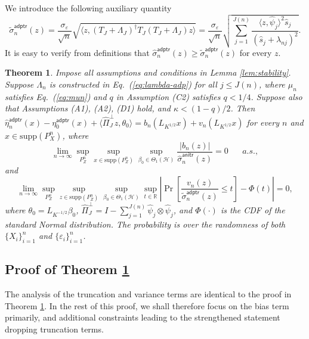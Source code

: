\documentclass[11pt,a4paper]{article}
\renewcommand{\hat}{\widehat}
\renewcommand{\tilde}{\widetilde}
\theoremstyle{definition}
\theoremstyle{plain}
\newtheorem{theorem}{Theorem}[section]
\theoremstyle{remark}
\newcommand{\supp}{\mathrm{supp}}
\newcommand{\mX}{\mathcal X}
\newcommand{\mH}{\mathcal H}
\newcommand{\anitr}{\mathsf{anitr}}
\newcommand{\adptr}{\mathsf{adptr}}
\begin{document}
We introduce the following auxiliary quantity
$$
\tilde\sigma_n^\adptr(z) =  \frac{\sigma_\varepsilon}{\sqrt{n}}\sqrt{\langle z, (T_J+\Lambda_J)^\dagger T_J(T_J+\Lambda_J)z\rangle} = \frac{\sigma_\varepsilon}{\sqrt{n}}\sqrt{\sum_{j=1}^{J(n)}\frac{\langle z,\hat\psi_j\rangle^2\hat s_j}{(\hat s_j+\lambda_{nj})^2}}.
$$
It is easy to verify from definitions that $\hat\sigma_n^\adptr(z)\geq \tilde\sigma_n^\adptr(z)$ for every $z$.

\begin{theorem}
Impose all assumptions and conditions in Lemma \ref{lem:stability}. Suppose $\Lambda_n$ is constructed in Eq.~(\ref{eq:lambda-adp}) for all $j\leq J(n)$,
where $\mu_n$ satisfies Eq.~(\ref{eq:mun}) and $q$ in Assumption (C2) satisfies $q<1/4$. Suppose also that Assumptions (A1), (A2), (D1) hold, and $\kappa<(1-q)/2$. Then 
$\hat\eta_n^\adptr(x)-\eta_0^\adptr(x)+\langle\hat\Pi_J^\perp z,\theta_0\rangle = b_n(L_{K^{1/2}}x)+v_n(L_{K^{1/2}}x)$ for every $n$ and $x\in\supp(P_X^n)$, where
$$
\lim_{n\to\infty}\sup_{P_Z^n}\sup_{x\in\supp(P_Z^n)}\sup_{\beta_0\in\Theta_1(\mH)} \frac{|b_n(z)|}{\hat\sigma_n^\anitr(z)} = 0\;\;\;\;\;\;a.s.,
$$
and
$$
\lim_{n\to\infty} \sup_{P_Z^n}\sup_{z\in\supp(P_Z^n)}\sup_{\beta_0\in\Theta_1(\mH)}\sup_{t\in\mathbb R}\left|\Pr\left[\frac{v_n(z)}{\tilde\sigma_n^\adptr(z)}\leq t\right] - \Phi(t)\right| = 0,
$$
where $\theta_0=L_{K^{-1/2}}\beta_0$, $\hat\Pi_J^\perp = I - \sum_{j=1}^{J(n)}\hat\psi_j\otimes\hat\psi_j$, and $\Phi(\cdot)$ is the CDF of the standard Normal distribution.
The probability is over the randomness of both $\{X_i\}_{i=1}^n$ and $\{\varepsilon_i\}_{i=1}^n$. 
%
\label{thm:adptr-limiting}
\end{theorem}

\subsection{Proof of Theorem \ref{thm:adptr-limiting}}

The analysis of the truncation and variance terms are identical to the proof in Theorem \ref{thm:adptr-limiting}.
In the rest of this proof, we shall therefore focus on the bias term primarily, and additional constraints leading to the strengthened statement dropping truncation terms.
\end{document}
